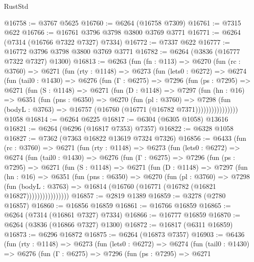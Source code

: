 \begin{lexlean}{RustStd}
\begin{coremodule}
@16758 := @3767 @5625
@16760 := @6264 (@16758 @7309)
@16761 := @7315 @622
@16766 := @16761 @3796 @3798 @3800 @3769 @3771
@16771 := @6264 (@7314 (@16766 @7322 @7327) @7334)
@16772 := @7337 @622
@16777 := @16772 @3796 @3798 @3800 @3769 @3771
@16782 := @6264 (@3836 (@16777 @7322 @7327) @1300)
@16813 := @6263
    (fun (fn : @113) =>
    @6270
      (fun (rc : @3760) =>
      @6271
        (fun (rty : @1148) =>
        @6273
          (fun (lets0 : @6272) =>
          @6274
            (fun (tail0 : @1430) =>
            @6276
              (fun (Γ : @6275) =>
              @7296
                (fun (ps : @7295) =>
                @6271
                  (fun (S : @1148) =>
                  @6271
                    (fun (D : @1148) =>
                    @7297
                      (fun (hn : @16) =>
                      @6351
                        (fun (pns : @6350) =>
                        @6270
                          (fun (pl : @3760) =>
                          @7298
                            (fun (bodyL : @3763) =>
                            @16757 (@16760 (@16771 (@16782 @7371))))))))))))))))
    @1058
@16814 := @6264 @6225
@16817 := @6304 (@6305 @1058) @13616
@16821 := @6264 (@6296 (@16817 @7353) @7357)
@16822 := @6328 @1058
@16827 := @7362 (@7363 @16822 @13619 @7324 @7326)
@16856 := @6433
    (fun (rc : @3760) =>
    @6271
      (fun (rty : @1148) =>
      @6273
        (fun (lets0 : @6272) =>
        @6274
          (fun (tail0 : @1430) =>
          @6276
            (fun (Γ : @6275) =>
            @7296
              (fun (ps : @7295) =>
              @6271
                (fun (S : @1148) =>
                @6271
                  (fun (D : @1148) =>
                  @7297
                    (fun (hn : @16) =>
                    @6351
                      (fun (pns : @6350) =>
                      @6270
                        (fun (pl : @3760) =>
                        @7298
                          (fun (bodyL : @3763) =>
                          @16814 (@16760 (@16771 (@16782 (@16821 @16827))))))))))))))))
@16857 := @2819 @1389
@16859 := @3278 (@2780 @16857)
@16860 := @16856 @16859
@16861 := @16766 @16859
@16865 := @6264 (@7314 (@16861 @7327) @7334)
@16866 := @16777 @16859
@16870 := @6264 (@3836 (@16866 @7327) @1300)
@16872 := @16817 (@6311 @16859)
@16873 := @6296 @16872
@16875 := @6264 (@16873 @7357)
@16903 := @6436
    (fun (rty : @1148) =>
    @6273
      (fun (lets0 : @6272) =>
      @6274
        (fun (tail0 : @1430) =>
        @6276
          (fun (Γ : @6275) =>
          @7296
            (fun (ps : @7295) =>
            @6271

\end{coremodule}
\end{lexlean}
